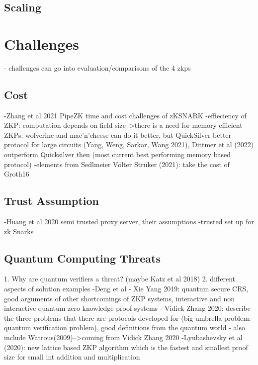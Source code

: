 \subsection{Scaling}

\section{Challenges}
- challenges can go into evaluation/comparisons of the 4 zkps
\subsection{Cost}
-Zhang et al 2021 PipeZK time and cost challenges of zKSNARK
-effieciency of ZKP: computation depends on field size-->there is a need for memory efficient ZKPs: wolverine and mac'n'cheese can do it better, but QuickSilver better protocol for large circuits (Yang, Weng, Sarkar, Wang 2021), Dittmer et al (2022) outperform Quicksilver then (most current best performing memory based protocol)
-elements from Sedlmeier Völter Strüker (2021): take the cost of Groth16

\subsection{Trust Assumption}
-Huang et al 2020 semi trusted proxy server, their assumptions
-trusted set up for zk Snarks

\subsection{Quantum Computing Threats}
1. Why are quantum verifiers a threat? (maybe Katz et al 2018)
2. different aspects of solution examples
-Deng et al 
- Xie Yang 2019: quantum secure CRS, good arguments of other shortcomings of ZKP systems, interactive and non interactive quantum zero knowledge proof systems
- Vidick Zhang 2020: describe the three problems that there are protocols developed for (big umbrella problem: quantum verification problem), good definitions from the quantum world
- also include Watrous(2009)-->coming from Vidick Zhang 2020
-Lyubashevsky et al (2020): new lattice based ZKP algorithm which is the fastest and smallest proof size for small int addition and multiplication 

